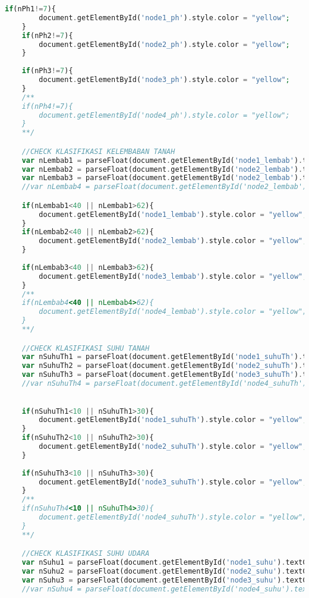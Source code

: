 \begin{lstlisting}[language=PHP, caption=skripsi\_sensing.blade.php]
    if(nPh1!=7){
        document.getElementById('node1_ph').style.color = "yellow";
    }
    if(nPh2!=7){
        document.getElementById('node2_ph').style.color = "yellow";
    }
    
    if(nPh3!=7){
        document.getElementById('node3_ph').style.color = "yellow";
    }
    /**
    if(nPh4!=7){
        document.getElementById('node4_ph').style.color = "yellow";
    }
    **/

    //CHECK KLASIFIKASI KELEMBABAN TANAH
    var nLembab1 = parseFloat(document.getElementById('node1_lembab').textContent);
    var nLembab2 = parseFloat(document.getElementById('node2_lembab').textContent);
    var nLembab3 = parseFloat(document.getElementById('node2_lembab').textContent);
    //var nLembab4 = parseFloat(document.getElementById('node2_lembab').textContent);

    if(nLembab1<40 || nLembab1>62){
        document.getElementById('node1_lembab').style.color = "yellow";
    }
    if(nLembab2<40 || nLembab2>62){
        document.getElementById('node2_lembab').style.color = "yellow";
    }
    
    if(nLembab3<40 || nLembab3>62){
        document.getElementById('node3_lembab').style.color = "yellow";
    }
    /**
    if(nLembab4<40 || nLembab4>62){
        document.getElementById('node4_lembab').style.color = "yellow";
    }
    **/

    //CHECK KLASIFIKASI SUHU TANAH
    var nSuhuTh1 = parseFloat(document.getElementById('node1_suhuTh').textContent);
    var nSuhuTh2 = parseFloat(document.getElementById('node2_suhuTh').textContent);
    var nSuhuTh3 = parseFloat(document.getElementById('node3_suhuTh').textContent);
    //var nSuhuTh4 = parseFloat(document.getElementById('node4_suhuTh').textContent);
  

    if(nSuhuTh1<10 || nSuhuTh1>30){
        document.getElementById('node1_suhuTh').style.color = "yellow";
    }
    if(nSuhuTh2<10 || nSuhuTh2>30){
        document.getElementById('node2_suhuTh').style.color = "yellow";
    }
    
    if(nSuhuTh3<10 || nSuhuTh3>30){
        document.getElementById('node3_suhuTh').style.color = "yellow";
    }
    /**
    if(nSuhuTh4<10 || nSuhuTh4>30){
        document.getElementById('node4_suhuTh').style.color = "yellow";
    }
    **/

    //CHECK KLASIFIKASI SUHU UDARA
    var nSuhu1 = parseFloat(document.getElementById('node1_suhu').textContent);
    var nSuhu2 = parseFloat(document.getElementById('node2_suhu').textContent);
    var nSuhu3 = parseFloat(document.getElementById('node3_suhu').textContent);
    //var nSuhu4 = parseFloat(document.getElementById('node4_suhu').textContent);
  


\end{lstlisting}
